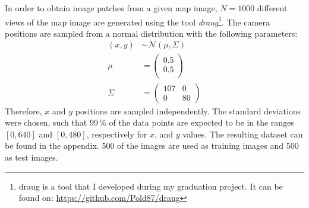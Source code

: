 \documentclass{article}
\begin{document}
In order to obtain image patches from a given map image, $N=1000$
different views of the map image are generated using the tool
\emph{draug}\footnote{draug is a tool that I developed during my
  graduation project. It can be found on:
  \url{https://github.com/Pold87/draug}}. The camera positions are
sampled from a normal distribution with the following parameters:
\begin{align}
  (x, y) &\sim \mathcal{N}(\mu, \Sigma)\\
  \mu &=
  \begin{pmatrix}
    0.5\\
    0.5\\
  \end{pmatrix}
\\
  \Sigma &= \begin{pmatrix} 107 & 0\\
    0 & 80 \end{pmatrix}
\end{align}
Therefore, $x$ and $y$ positions are sampled independently. The
standard deviations were chosen, such that 99\,\% of the data points
are expected to be in the ranges $[0, 640]$ and $[0, 480]$,
respectively for $x$, and $y$ values. The resulting dataset can be
found in the appendix. 500 of the images are used as training images
and 500 as test images.




\end{document}
